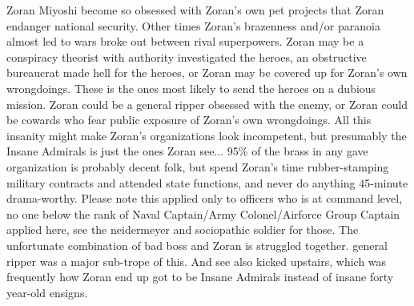 \documentclass[12pt]{book}
\begin{document}
Zoran Miyoshi become so obsessed with Zoran's own pet projects that Zoran endanger national security. Other times Zoran's brazenness and/or paranoia almost led to wars broke out between rival superpowers. Zoran may be a conspiracy theorist with authority investigated the heroes, an obstructive bureaucrat made hell for the heroes, or Zoran may be covered up for Zoran's own wrongdoings. These is the ones most likely to send the heroes on a dubious mission. Zoran could be a general ripper obsessed with the enemy, or Zoran could be cowards who fear public exposure of Zoran's own wrongdoings. All this insanity might make Zoran's organizations look incompetent, but presumably the Insane Admirals is just the ones Zoran see... 95\% of the brass in any gave organization is probably decent folk, but spend Zoran's time rubber-stamping military contracts and attended state functions, and never do anything 45-minute drama-worthy. Please note this applied only to officers who is at command level, no one below the rank of Naval Captain/Army Colonel/Airforce Group Captain applied here, see the neidermeyer and sociopathic soldier for those. The unfortunate combination of bad boss and Zoran is struggled together. general ripper was a major sub-trope of this. And see also kicked upstairs, which was frequently how Zoran end up got to be Insane Admirals instead of insane forty year-old ensigns.
\end{document}
